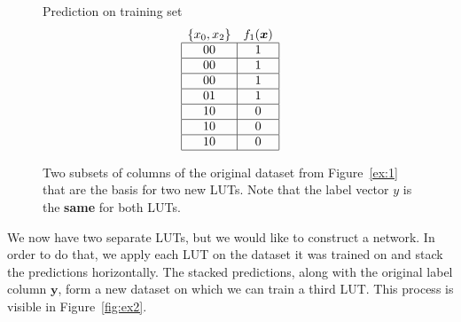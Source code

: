\begin{figure}[!htb]
\begin{minipage}{.95\linewidth}
\begin{minipage}[b]{.21\linewidth}
      \vspace{1em}
    Prediction on training set
    \vspace{-0.5em}
    \begin{align*}
      \begin{array}{cc}
        \{x_0,x_2\}                    & f_1(\bm{x})              \\ \hline
        \multicolumn{1}{|c|}{00} & \multicolumn{1}{c|}{1} \\ \hline
        \multicolumn{1}{|c|}{00} & \multicolumn{1}{c|}{1} \\ \hline
        \multicolumn{1}{|c|}{00} & \multicolumn{1}{c|}{1} \\ \hline
        \multicolumn{1}{|c|}{01} & \multicolumn{1}{c|}{1} \\ \hline
        \multicolumn{1}{|c|}{10} & \multicolumn{1}{c|}{0} \\ \hline
        \multicolumn{1}{|c|}{10} & \multicolumn{1}{c|}{0} \\ \hline
        \multicolumn{1}{|c|}{10} & \multicolumn{1}{c|}{0} \\ \hline
      \end{array}
    \end{align*}
  \end{minipage}
\end{minipage}
  \normalfont
  \caption{Two subsets of columns of the original dataset from Figure~\ref{ex:1} that are the basis for two new LUTs. Note that the label vector $y$ is the \textbf{same} for both LUTs.}
    \label{fig:ex1}
\end{figure}
\FloatBarrier

\noindent We now have two separate LUTs, but we would like to construct a network. In order to do that, we apply each LUT on the dataset it was trained on and stack the predictions horizontally. The stacked predictions, along with the original label column $\bm{y}$, form a new dataset on which we can train a third LUT. This process is visible in Figure~\ref{fig:ex2}.

